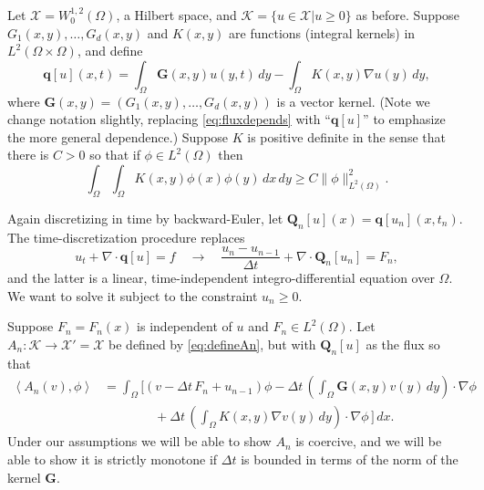 \documentclass[final,leqno,onefignum,onetabnum]{siamltex1213bueler}
\newcommand\bG{\mathbf{G}}
\newcommand\bq{\mathbf{q}}
\newcommand\bQ{\mathbf{Q}}
\newcommand{\Div}{\nabla\cdot}
\renewcommand{\grad}{\nabla}
\newcommand{\ip}[2]{\ensuremath{\left<#1,#2\right>}}
\begin{document}
Let $\mathcal{X} = W_0^{1,2}(\Omega)$, a Hilbert space, and $\mathcal{K}=\{u\in\mathcal{X}|u\ge 0\}$ as before.  Suppose $G_1(x,y), \dots, G_d(x,y)$ and $K(x,y)$ are functions (integral kernels) in $L^2(\Omega\times \Omega)$, and define
\begin{equation}
\bq[u](x,t) = \int_\Omega \bG(x,y) u(y,t)\,dy - \int_\Omega K(x,y) \grad u(y)\,dy, \label{eq:nonlocaldefnq}
\end{equation}
where $\bG(x,y) = (G_1(x,y), \dots, G_d(x,y))$ is a vector kernel.  (Note we change notation slightly, replacing \eqref{eq:fluxdepends} with ``$\bq[u]$'' to emphasize the more general dependence.)  Suppose $K$ is positive definite in the sense that there is $C>0$ so that if $\phi \in L^2(\Omega)$ then
\begin{equation}
   \int_\Omega \int_\Omega K(x,y) \phi(x) \phi(y)\,dx\,dy \ge C \|\phi\|_{L^2(\Omega)}^2.  \label{eq:nonlocalKpos}
\end{equation}

Again discretizing in time by backward-Euler, let $\bQ_n[u](x)=\bq[u_n](x,t_n)$.  The time-discretization procedure replaces
	$$u_t + \Div \bq[u] = f \quad \to \quad \frac{u_n - u_{n-1}}{\Delta t} + \Div \bQ_n[u_n] = F_n,$$
and the latter is a linear, time-independent integro-differential equation over $\Omega$.  We want to solve it subject to the constraint $u_n\ge 0$.

Suppose $F_n=F_n(x)$ is independent of $u$ and $F_n\in L^2(\Omega)$.  Let $A_n:\mathcal{K} \to \mathcal{X}'=\mathcal{X}$ be defined by \eqref{eq:defineAn}, but with $\bQ_n[u]$ as the flux so that
\begin{align*}
    \ip{A_n(v)}{\phi} &= \int_\Omega \bigg[(v - \Delta t\,F_n + u_{n-1})\phi - \Delta t\,\left(\int_\Omega \bG(x,y) v(y)\,dy\right)\cdot \grad \phi \\
                      &\qquad\qquad + \Delta t\,\left(\int_\Omega K(x,y) \grad v(y)\,dy\right)\cdot \grad \phi\,\bigg]\,dx.
\end{align*}
Under our assumptions we will be able to show $A_n$ is coercive, and we will be able to show it is strictly monotone if $\Delta t$ is bounded in terms of the norm of the kernel $\bG$.
\end{document}
